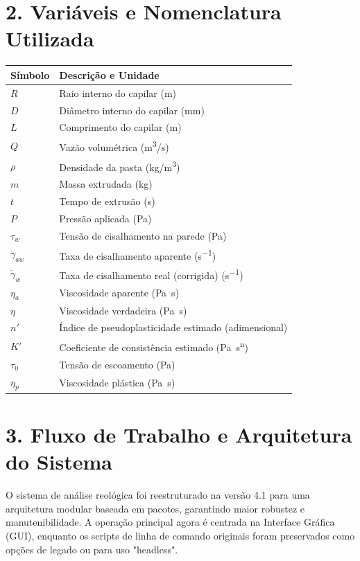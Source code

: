 \documentclass[a4paper,12pt]{article}
\begin{document}
\section*{2. Variáveis e Nomenclatura Utilizada}
\begin{center}
\begin{tabular}{@{}l l@{}}
\toprule
\textbf{Símbolo} & \textbf{Descrição e Unidade} \\
\midrule
$R$ & Raio interno do capilar (\si{m}) \\
$D$ & Diâmetro interno do capilar (\si{mm}) \\
$L$ & Comprimento do capilar (\si{m}) \\
$Q$ & Vazão volumétrica (\si{m^{3}/s}) \\
$\rho$ & Densidade da pasta (\si{kg/m^{3}}) \\
$m$ & Massa extrudada (\si{kg}) \\
$t$ & Tempo de extrusão (\si{s}) \\
$P$ & Pressão aplicada (\si{Pa}) \\
$\tau_w$ & Tensão de cisalhamento na parede (\si{Pa}) \\
$\dot{\gamma}_{aw}$ & Taxa de cisalhamento aparente (\si{s^{-1}}) \\
$\dot{\gamma}_w$ & Taxa de cisalhamento real (corrigida) (\si{s^{-1}}) \\
$\eta_a$ & Viscosidade aparente (\si{Pa.s}) \\
$\eta$ & Viscosidade verdadeira (\si{Pa.s}) \\
$n'$ & Índice de pseudoplasticidade estimado (adimensional) \\
$K'$ & Coeficiente de consistência estimado (\si{Pa.s^n}) \\
$\tau_0$ & Tensão de escoamento (\si{Pa}) \\
$\eta_p$ & Viscosidade plástica (\si{Pa.s}) \\
\bottomrule
\end{tabular}
\end{center}

\section*{3. Fluxo de Trabalho e Arquitetura do Sistema}

O sistema de análise reológica foi reestruturado na versão 4.1 para uma arquitetura modular baseada em pacotes, garantindo maior robustez e manutenibilidade. A operação principal agora é centrada na Interface Gráfica (GUI), enquanto os scripts de linha de comando originais foram preservados como opções de legado ou para uso "headless".
\end{document}
